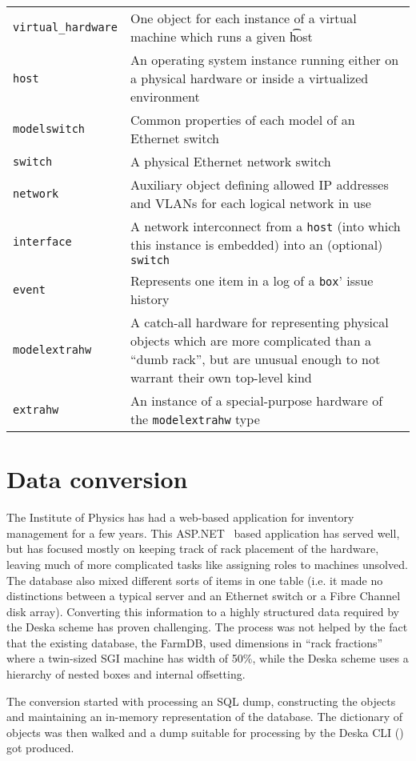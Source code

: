 \documentclass[deska]{subfiles}
\begin{document}
\begin{longtable}{ l | l}
    {\tt virtual\_hardware} & One object for each instance of a virtual machine which runs a given {\t host} \\
    {\tt host} & An operating system instance running either on a physical hardware or inside a virtualized environment
    \\
    {\tt modelswitch} & Common properties of each model of an Ethernet switch \\
    {\tt switch } & A physical Ethernet network switch \\
    {\tt network} & Auxiliary object defining allowed IP addresses and VLANs for each logical network in use \\
    {\tt interface} & A network interconnect from a {\tt host} (into which this instance is embedded) into an (optional)
    {\tt switch} \\
    {\tt event} & Represents one item in a log of a {\tt box}' issue history \\
    {\tt modelextrahw} & A catch-all hardware for representing physical objects which are more complicated than a
    ``dumb rack'', but are unusual enough to not warrant their own top-level kind \\
    {\tt extrahw} & An instance of a special-purpose hardware of the {\tt modelextrahw} type
\end{longtable}

\section{Data conversion}
\label{sec:fzu-farmdb}

The Institute of Physics has had a web-based application for inventory management for a few years.  This
ASP.NET~\cite{asp.net} based application has served well, but has focused mostly on keeping track of rack placement of
the hardware, leaving much of more complicated tasks like assigning roles to machines unsolved.  The database also mixed
different sorts of items in one table (i.e. it made no distinctions between a typical server and an Ethernet switch or a
Fibre Channel disk array).  Converting this information to a highly structured data required by the Deska scheme has
proven challenging.  The process was not helped by the fact that the existing database, the FarmDB, used dimensions in
``rack fractions'' where a twin-sized SGI machine has width of 50\%, while the Deska scheme uses a hierarchy of nested
boxes and internal offsetting.

The conversion started with processing an SQL dump, constructing the objects and maintaining an in-memory representation
of the database.  The dictionary of objects was then walked and a dump suitable for processing by the Deska CLI
() got produced.
\end{document}
